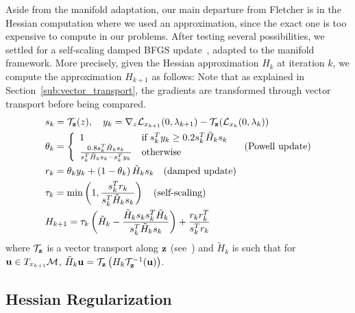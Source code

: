 Aside from the manifold adaptation, our main departure from Fletcher is in the Hessian computation where we used an approximation, since the exact one is too expensive to compute in our problems.
After testing several possibilities, we settled for a self-scaling damped BFGS update~\cite{nocedal:mp:1993,nocedal:book:2006}, adapted to the manifold framework.
More precisely, given the Hessian approximation $H_k$ at iteration $k$, we compute the approximation $H_{k+1}$ as follows:
Note that as explained in Section~\ref{sub:vector_transport}, the gradients are transformed through vector transport before being compared.
\begin{align}
  &s_k = \mathcal{T}_{\bf z}(z), \quad y_k = \nabla_z \mathcal{L}_{x_{k+1}}(0,\lambda_{k+1}) - \mathcal{T}_{\bf z}(\mathcal{L}_{x_{k}}(0,\lambda_{k})) \nonumber\\
  &\theta_k = \left\{\begin{array}{ll}
    1 & \mbox{if} \; s_k^T y_k \geq 0.2 s_k^T \tilde{H}_k s_k \\
    \frac{0.8 s_k^T \tilde{H}_k s_k}{s_k^T \tilde{H}_k s_k - s_k^T y_k} & \mbox{otherwise}
  \end{array}\right. \quad \mbox{(Powell update)}\nonumber\\
  &r_k = \theta_k y_k + \left(1-\theta_k\right) \tilde{H}_k s_k \quad \mbox{(damped update)} \nonumber\\
  &\tau_k = \min\left(1, \frac{s_k^T r_k}{s_k^T \tilde{H}_k s_k} \right) \quad \mbox{(self-scaling)} \nonumber\\
  &H_{k+1} = \tau_k \left(\tilde{H}_k-\frac{\tilde{H}_k s_k s_k^T \tilde{H}_k}{s_k^T \tilde{H}_k s_k} \right) + \frac{r_k r_k^T}{s_k^T r_k} \nonumber%
\end{align}
where $\mathcal{T}_{\bf z}$ is a vector transport along ${\bf z}$ (see~\cite{absil:book:2008}) and $\tilde{H}_k$ is such that for ${\bf u} \in T_{x_{k+1}} \mathcal{M}$, $\tilde{H}_k {\bf u} = \mathcal{T}_{\bf z}\left(H_k \mathcal{T}_{\bf z}^{-1}({\bf u}) \right)$.

\subsection{Hessian Regularization}
\label{sub:hessian_regularization}

